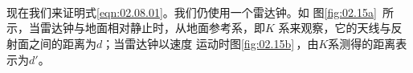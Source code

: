 \begin{figurex}[!b]
    \centering
     \\ \vspace{-0.3em}
     \\ \vspace{-0.3em}
     \\ \vspace{-0.3em}
    \caption{}
    \label{fig:02.15}
\end{figurex}
现在我们来证明式\eqref{eqn:02.08.01}。我们仍使用一个雷达钟。如
图\ref{fig:02.15a}~所示，当雷达钟与地面相对静止时，从地面参考系，即$K$
系来观察，它的天线与反射面之间的距离为$ d$；当雷达钟以速度
运动时\lhbrak 图\ref{fig:02.15b}\,\rhbrak ，由$K$系测得的距离表示为$d'$。

